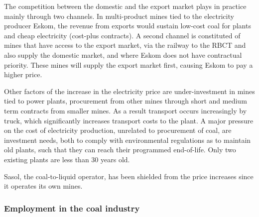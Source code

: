 \documentclass[12pt,english]{article}
\begin{document}
The competition between the domestic and the export market plays in practice mainly through two channels. In multi-product mines tied to the electricity producer Eskom, the revenue from exports would sustain low-cost coal for plants and cheap electricity (cost-plus contracts).
A second channel is constituted of mines that have access to the export market, via the railway to the RBCT and also supply the domestic market, and where Eskom does not have contractual priority. These mines will supply the export market first, causing Eskom to pay a higher price.

Other factors of the increase in the electricity price are under-investment in mines tied to power plants, procurement from other mines through short and medium term contracts from smaller mines. As a result transport occurs increasingly by truck, which significantly increases transport costs to the plant. A major pressure on the cost of electricity production, unrelated to procurement of coal, are investment needs, both to comply with environmental regulations as to maintain old plants, such that they can reach their programmed end-of-life. Only two existing plants are less than 30 years old.

Sasol, the coal-to-liquid operator, has been shielded from the price increases since it operates its own mines. %

\subsubsection{Employment in the coal industry}
\end{document}
